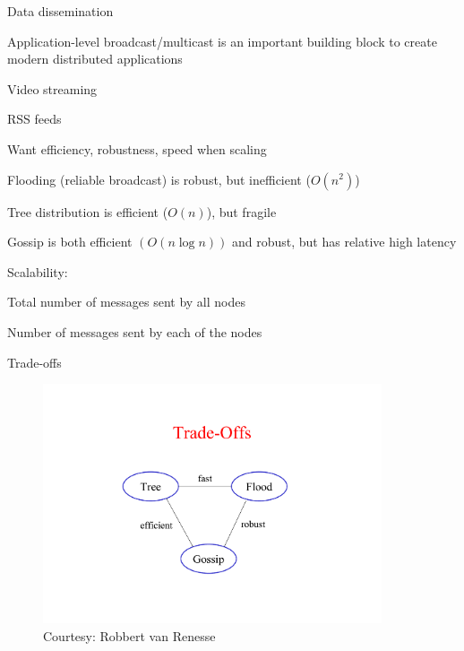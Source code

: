 \begin{frame}{Data dissemination}


\BIL
\item Application-level broadcast/multicast is an important building block
to create modern distributed applications

\BI
\item Video streaming
\item RSS feeds
\EI

\item Want efficiency, robustness, speed when scaling
\BI
\item \alert{Flooding} (reliable broadcast) is robust, but inefficient ($O(n^2)$)
\item \alert{Tree} distribution is efficient ($O(n)$), but fragile
\item \alert{Gossip} is both efficient $(O(n \log n))$ and robust, but has relative
  high latency
\EI

\item Scalability:
\BI
\item Total number of messages sent by all nodes
\item Number of messages sent by each of the nodes
\EI

\EIL


\end{frame}

\begin{frame}{Trade-offs}
	
\begin{figure}
	\includegraphics[width=10cm]{tradeoffs}
	\caption{Courtesy: Robbert van Renesse}
\end{figure}
\end{frame}


